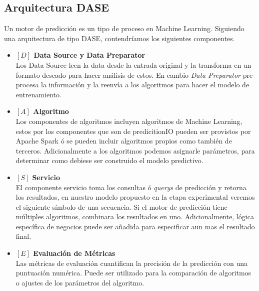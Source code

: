 \subsection{Arquitectura DASE}


Un motor de predicción es un tipo de proceso en Machine Learning. Siguiendo una arquitectura de tipo {DASE}, contendríamos los siguientes componentes.



\begin{itemize}

  \item \textbf{ $[D]$ Data Source y Data Preparator }\\
  Los Data Source leen la data desde la entrada original y la transforma en un formato deseado para hacer análisis de estos. En cambio \emph{Data Preparator} pre-procesa la información y la reenvía a los algoritmos para   hacer el modelo de entrenamiento.


    \item \textbf{ $[A]$ Algoritmo}\\
  Los componentes de algoritmos incluyen algoritmos de Machine Learning, estos por los componentes que son de predicitionIO pueden ser provistos por Apache Spark ó se pueden incluir algoritmos propios como también de terceros.
  Adicionalmente a los algoritmos podemos asignarle parámetros, para determinar como debiese ser construido el modelo predictivo.



    \item \textbf{ $[S]$ Servicio}\\
    
    El componente servicio toma los consultas ó \emph{querys} de predicción y retorna los resultados, en nuestro modelo propuesto en la etapa experimental veremos el siguiente símbolo de una secuencia. 
    Si el motor de predicción tiene múltiples algoritmos, combinara los resultados en uno. Adicionalmente, lógica específica de negocios puede ser añadida para especificar aun mas el resultado final. 
 
    \item \textbf{ $[E]$ Evaluación de Métricas}\\
Las métricas de evaluación cuantifican la precisión de la predicción con una puntuación numérica. Puede ser utilizado para la comparación de algoritmos o ajustes de los parámetros del algoritmo.


\end{itemize}




